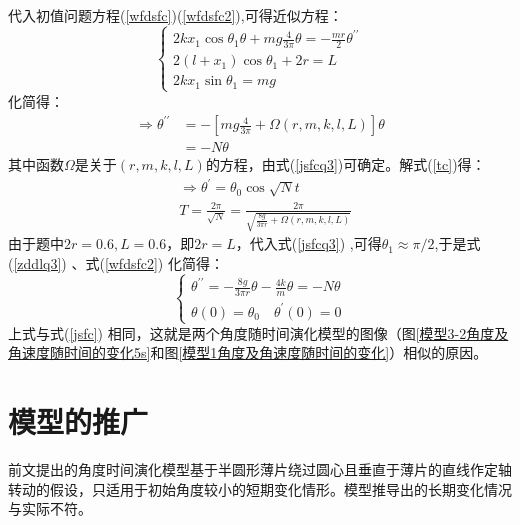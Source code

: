\documentclass[withoutpreface,bwprint]{cumcmthesis} %
\begin{document}
	代入初值问题方程(\ref{wfdsfc})(\ref{wfdsfc2}),可得近似方程：
	\begin{equation}\label{jsfcq3}
	\left\{\begin{array}{l}
	2 k x_{1} \cos \theta_{1} \theta+m g \frac{4}{3 \pi} \theta=-\frac{m r}{2} \theta^{\prime \prime} \\
	2\left(l+x_{1}\right) \cos \theta_{1}+2 r=L \\
	2 k x_{1} \sin \theta_{1}=m g 
	\end{array}\right.
	\end{equation}
	化简得：
	\begin{equation}\label{tc}
	\begin{aligned}
	\Rightarrow \theta^{\prime \prime} &=-\left[m g \frac{4}{3 \pi}+\Omega(r, m, k, l, L)\right] \theta \\
	&=-N \theta
	\end{aligned}
	\end{equation}
	其中函数$\Omega$是关于$(r, m, k, l, L)$的方程，由式(\ref{jsfcq3})可确定。解式(\ref{tc})得：
	\begin{equation}\label{jd}
	\begin{aligned}
	&\Rightarrow \theta^{\prime}=\theta_{0} \cos \sqrt{N} t \\
	&T=\frac{2 \pi}{\sqrt{N}}=\frac{2 \pi}{\sqrt{\frac{8g}{3 \pi r}+\Omega(r, m, k, l, L)}}
	\end{aligned}
	\end{equation}
	由于题中$2 r = 0.6,L=0.6$，即$2r=L$，代入式(\ref{jsfcq3}) ,可得$\theta_1 \approx \pi/2$,于是式(\ref{zddlq3}) 、式(\ref{wfdsfc2}) 化简得：
		\begin{equation}\label{jsfc2}
	\left\{\begin{array}{l}
	\theta^{\prime \prime}=-\frac{8g}{3 \pi r} \theta-\frac{4 k}{m} \theta=-N \theta\\
	\theta(0)=\theta_{0} \quad \theta^{\prime}(0)=0
	\end{array}\right.
	\end{equation}
	上式与式(\ref{jsfc}) 相同，这就是两个角度随时间演化模型的图像（图\ref{模型3-2角度及角速度随时间的变化5s}和图\ref{模型1角度及角速度随时间的变化}）相似的原因。
	
	
	
	
	
	\section{模型的推广}
	前文提出的角度时间演化模型基于半圆形薄片绕过圆心且垂直于薄片的直线作定轴转动的假设，只适用于初始角度较小的短期变化情形。模型推导出的长期变化情况与实际不符。
	
\end{document}
